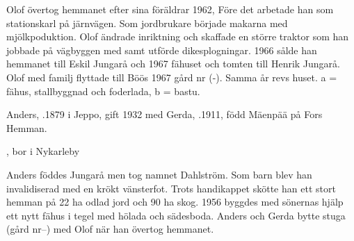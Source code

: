 Olof övertog hemmanet efter sina föräldrar 1962, Före det arbetade han som stationskarl på järnvägen. Som jordbrukare började makarna med mjölkpoduktion. Olof ändrade inriktning och skaffade en större traktor som  han jobbade på vägbyggen med samt utförde dikesplogningar. 1966 sålde han hemmanet till Eskil Jungarå och 1967 fähuset och tomten till Henrik Jungarå. Olof med familj flyttade till Böös 1967 gård nr (-). Samma år revs huset.  a = fähus, stallbyggnad och foderlada, b = bastu.


Anders, .1879 i Jeppo, gift 1932 med Gerda, .1911, född Mäenpää på Fors Hemman.
\begin{jhchildren}
  \item {}
  \item {}
  \item {}
  \item {}
  \item {}
  \item {}
  \item {}, bor i Nykarleby
\end{jhchildren}
Anders föddes Jungarå men tog namnet Dahlström. Som barn blev han invalidiserad med en krökt vänsterfot. Trots handikappet skötte han ett stort hemman på 22 ha odlad jord och 90 ha skog. 1956 byggdes med sönernas hjälp ett nytt fähus i tegel med hölada och sädesboda. Anders och Gerda bytte stuga (gård nr--) med Olof när han övertog hemmanet.


